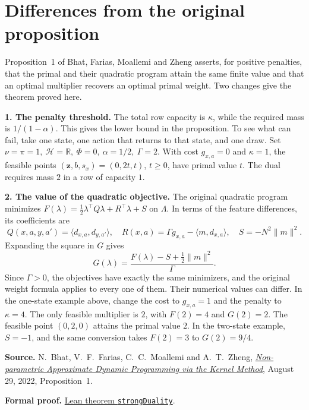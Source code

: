 \documentclass[12pt,a4paper]{article}
\newcommand{\ip}[2]{\langle #1,#2\rangle}
\newcommand{\norm}[1]{\lVert #1\rVert}
\newcommand{\R}{\mathbb R}
\newcommand{\lead}[1]{\par\smallskip\noindent\textbf{#1}\enspace}
\begin{document}
\section*{Differences from the original proposition}
Proposition~1 of Bhat, Farias, Moallemi and Zheng asserts, for positive
penalties, that the primal and their quadratic program attain the same
finite value and that an optimal multiplier recovers an optimal primal
weight. Two changes give the theorem proved here.

\lead{1. The penalty threshold.}
The total row capacity is \(\kappa\), while the required mass is \(1/(1-\alpha)\).
This gives the lower bound in the proposition. To see what can fail, take one
state, one action that returns to that state, and one draw. Set
\(\nu=\pi=1,\ \mathcal H=\R,\ \Phi=0,\ \alpha=1/2,\ \Gamma=2\).
With cost \(g_{x,a}=0\) and \(\kappa=1\), the feasible points
\((\mathbf z,b,s_x)=(0,2t,t)\), \(t\ge0\), have primal value \(t\).
The dual requires mass \(2\) in a row of capacity \(1\).

\lead{2. The value of the quadratic objective.}
The original quadratic program minimizes
\(F(\lambda)=\tfrac12\lambda^\top Q\lambda+R^\top\lambda+S\) on
\(\Lambda\). In terms of the feature differences, its coefficients are
\[
 Q(x,a,y,a')=\ip{d_{x,a}}{d_{y,a'}},\quad
 R(x,a)=\Gamma g_{x,a}-\ip{m}{d_{x,a}},\quad S=-N^2\norm{m}^2 .
\]
Expanding the square in \(G\) gives
\[
     G(\lambda)=\frac{F(\lambda)-S+\tfrac12\norm{m}^2}{\Gamma}.
\]
Since \(\Gamma>0\), the objectives have exactly the same minimizers, and
the original weight formula applies to every one of them. Their numerical
values can differ. In the one-state example above, change the cost to
\(g_{x,a}=1\) and the penalty to \(\kappa=4\). The only feasible multiplier is
\(2\), with \(F(2)=4\) and \(G(2)=2\). The feasible point \((0,2,0)\)
attains the primal value \(2\). In the two-state example, \(S=-1\), and the
same conversion takes \(F(2)=3\) to \(G(2)=9/4\).

\smallskip
{\small
\textbf{Source.} N.~Bhat, V.~F.~Farias, C.~C.~Moallemi and A.~T.~Zheng,
\href{https://moallemi.com/ciamac/papers/kernel-adp-2012.pdf\#page=8}{\emph{Non-parametric Approximate Dynamic Programming via the Kernel Method}},
August 29, 2022, Proposition~1.\par
\textbf{Formal proof.} \href{https://github.com/nikhilpb/kadp/blob/main/Kadp/PrimalAttainment.lean}{Lean theorem \texttt{strongDuality}}.
}
\end{document}

